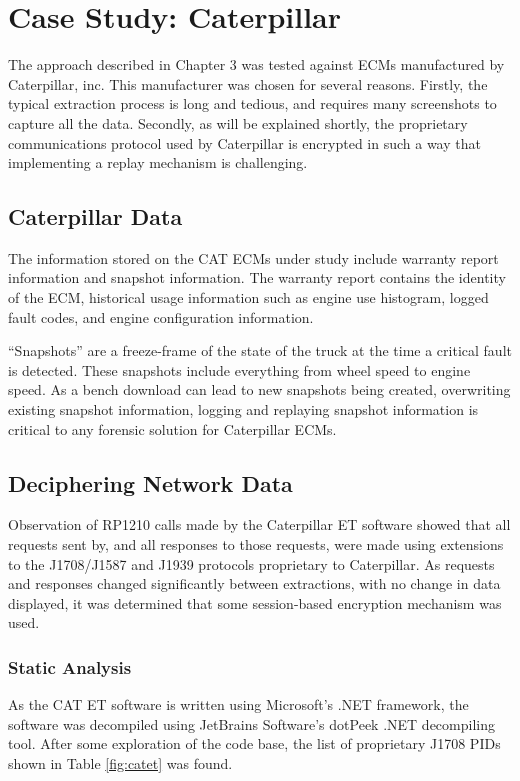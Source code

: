 \chapter{Case Study: Caterpillar}

The approach described in Chapter 3 was tested against ECMs manufactured by Caterpillar, inc. This manufacturer was
chosen for several reasons. Firstly, the typical extraction process is long and tedious, and requires many screenshots to capture all the data. 
Secondly, as will be explained shortly, the proprietary communications protocol used
by Caterpillar is encrypted in such a way that implementing a replay mechanism is challenging.

\section{Caterpillar Data}

The information stored on the CAT ECMs under study include warranty report information and snapshot
information. The warranty report contains the identity of the ECM, historical usage information such as engine use histogram,
logged fault codes, and engine configuration information.

``Snapshots'' are a freeze-frame of the state of the truck at the time a critical fault is detected. These snapshots
include everything from wheel speed to engine speed. As a bench download can lead to new snapshots being created, overwriting
existing snapshot information, logging and replaying snapshot information is critical to any forensic solution for
Caterpillar ECMs.

\section{Deciphering Network Data}

Observation of RP1210 calls made by the Caterpillar ET software showed that all requests sent by,
and all responses to those requests, were made using extensions to the J1708/J1587 and J1939 protocols
proprietary to Caterpillar. As requests and responses changed significantly between extractions, with
no change in data displayed, it was determined that some session-based encryption mechanism was
used.

\subsection{Static Analysis}

As the CAT ET software is written using Microsoft's .NET framework, the software was decompiled
using JetBrains Software's dotPeek .NET decompiling tool. After some exploration of the code base,
the list of proprietary J1708 PIDs shown in Table \ref{fig:catet} was found.

